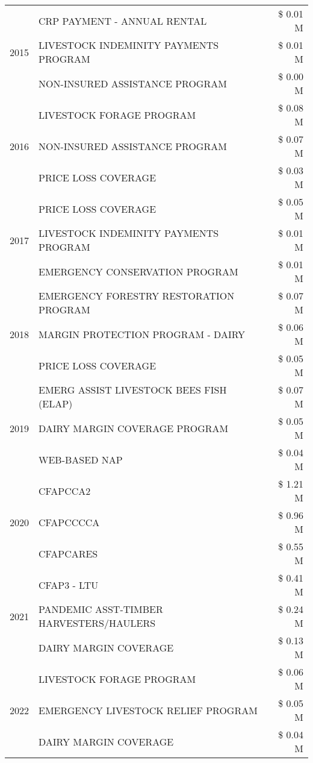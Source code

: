 \begin{tabular}{llr}
\cline{1-3}
\multirow[t]{3}{*}{2015} & CRP PAYMENT - ANNUAL RENTAL & \$ 0.01 M \\
 & LIVESTOCK INDEMINITY PAYMENTS PROGRAM & \$ 0.01 M \\
 & NON-INSURED ASSISTANCE PROGRAM & \$ 0.00 M \\
\cline{1-3}
\multirow[t]{3}{*}{2016} & LIVESTOCK FORAGE PROGRAM & \$ 0.08 M \\
 & NON-INSURED ASSISTANCE PROGRAM & \$ 0.07 M \\
 & PRICE LOSS COVERAGE & \$ 0.03 M \\
\cline{1-3}
\multirow[t]{3}{*}{2017} & PRICE LOSS COVERAGE & \$ 0.05 M \\
 & LIVESTOCK INDEMINITY PAYMENTS PROGRAM & \$ 0.01 M \\
 & EMERGENCY CONSERVATION PROGRAM & \$ 0.01 M \\
\cline{1-3}
\multirow[t]{3}{*}{2018} & EMERGENCY FORESTRY RESTORATION PROGRAM & \$ 0.07 M \\
 & MARGIN PROTECTION PROGRAM - DAIRY & \$ 0.06 M \\
 & PRICE LOSS COVERAGE & \$ 0.05 M \\
\cline{1-3}
\multirow[t]{3}{*}{2019} & EMERG ASSIST LIVESTOCK BEES FISH (ELAP) & \$ 0.07 M \\
 & DAIRY MARGIN COVERAGE PROGRAM & \$ 0.05 M \\
 & WEB-BASED NAP & \$ 0.04 M \\
\cline{1-3}
\multirow[t]{3}{*}{2020} & CFAPCCA2 & \$ 1.21 M \\
 & CFAPCCCCA & \$ 0.96 M \\
 & CFAPCARES & \$ 0.55 M \\
\cline{1-3}
\multirow[t]{3}{*}{2021} & CFAP3 - LTU & \$ 0.41 M \\
 & PANDEMIC ASST-TIMBER HARVESTERS/HAULERS & \$ 0.24 M \\
 & DAIRY MARGIN COVERAGE & \$ 0.13 M \\
\cline{1-3}
\multirow[t]{3}{*}{2022} & LIVESTOCK FORAGE PROGRAM & \$ 0.06 M \\
 & EMERGENCY LIVESTOCK RELIEF PROGRAM & \$ 0.05 M \\
 & DAIRY MARGIN COVERAGE & \$ 0.04 M \\
\cline{1-3}
\bottomrule
\end{tabular}
